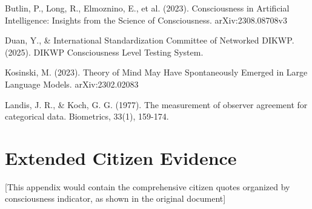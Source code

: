 \documentclass[12pt,a4paper]{article}
\begin{document}
Butlin, P., Long, R., Elmoznino, E., et al. (2023). Consciousness in Artificial Intelligence: Insights from the Science of Consciousness. arXiv:2308.08708v3

Duan, Y., \& International Standardization Committee of Networked DIKWP. (2025). DIKWP Consciousness Level Testing System.

Kosinski, M. (2023). Theory of Mind May Have Spontaneously Emerged in Large Language Models. arXiv:2302.02083

Landis, J. R., \& Koch, G. G. (1977). The measurement of observer agreement for categorical data. Biometrics, 33(1), 159-174.

\appendix

\section{Extended Citizen Evidence}

[This appendix would contain the comprehensive citizen quotes organized by consciousness indicator, as shown in the original document]
\end{document}
